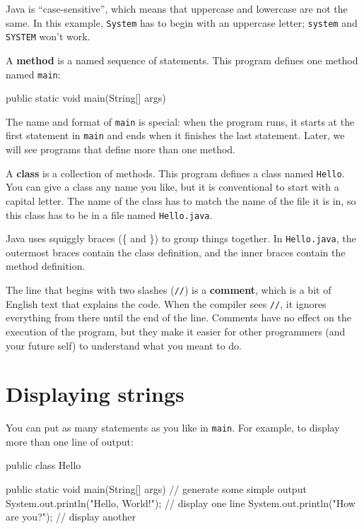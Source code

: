 \documentclass[12pt]{book}
\theoremstyle{exercise}
\newcommand{\java}[1]{\verb"#1"}
\begin{document}
Java is ``case-sensitive'', which means that uppercase and lowercase are not the same.
In this example, \java{System} has to begin with an uppercase letter; \java{system} and \java{SYSTEM} won't work.


A {\bf method} is a named sequence of statements.
This program defines one method named \java{main}:

\begin{code}
    public static void main(String[] args)
\end{code}


The name and format of \java{main} is special: when the program runs, it starts at the first statement in \java{main} and ends when it finishes the last statement.
Later, we will see programs that define more than one method.


A {\bf class} is a collection of methods.
This program defines a class named \java{Hello}.
You can give a class any name you like, but it is conventional to start with a capital letter.
The name of the class has to match the name of the file it is in, so this class has to be in a file named \java{Hello.java}.


Java uses squiggly braces (\{ and \}) to group things together.
In {\tt Hello.java}, the outermost braces contain the class definition, and the inner braces contain the method definition.


The line that begins with two slashes (\java{//}) is a {\bf comment}, which is a bit of English text that explains the code.
When the compiler sees \java{//}, it ignores everything from there until the end of the line.
Comments have no effect on the execution of the program, but they make it easier for other programmers (and your future self) to understand what you meant to do.


\section{Displaying strings}

You can put as many statements as you like in \java{main}.
For example, to display more than one line of output:

\begin{code}
public class Hello {

    public static void main(String[] args) {
        // generate some simple output
        System.out.println("Hello, World!");  // display one line
        System.out.println("How are you?");   // display another
    }
}
\end{code}
\end{document}
